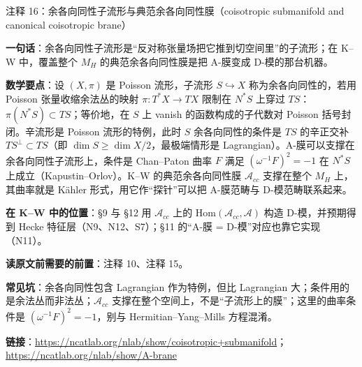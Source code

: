 \begin{kcard}{注释 16：余各向同性子流形与典范余各向同性膜（coisotropic submanifold and canonical coisotropic brane）}

\textbf{一句话}：余各向同性子流形是“反对称张量场把它推到切空间里”的子流形；在 K--W 中，覆盖整个 $M_H$ 的典范余各向同性膜是把 A-膜变成 D-模的那台机器。

\textbf{数学要点}：设 $(X,\pi)$ 是 Poisson 流形，子流形 $S\hookrightarrow X$ 称为余各向同性的，若用 Poisson 张量收缩余法丛的映射 $\pi:T^*X\to TX$ 限制在 $N^*S$ 上穿过 $TS$：$\pi(N^*S)\subset TS$；等价地，在 $S$ 上 vanish 的函数构成的子代数对 Poisson 括号封闭。辛流形是 Poisson 流形的特例，此时 $S$ 余各向同性的条件是 $TS$ 的辛正交补 $TS^{\perp}\subset TS$（即 $\dim S\ge\dim X/2$，最极端情形是 Lagrangian）。A-膜可以支撑在余各向同性子流形上，条件是 Chan--Paton 曲率 $F$ 满足 $(\omega^{-1}F)^2=-1$ 在 $N^*S$ 上成立（Kapustin--Orlov）。K--W 的典范余各向同性膜 $\mathcal{A}_{cc}$ 支撑在整个 $M_H$ 上，其曲率就是 Kähler 形式，用它作“探针”可以把 A-膜范畴与 D-模范畴联系起来。

\textbf{在 K--W 中的位置}：§9 与 §12 用 $\mathcal{A}_{cc}$ 上的 $\mathrm{Hom}(\mathcal{A}_{cc},\mathcal{A})$ 构造 D-模，并预期得到 Hecke 特征层（N9、N12、S7）；§11 的“A-膜 = D-模”对应也靠它实现（N11）。

\textbf{读原文前需要的前置}：注释 10、注释 15。

\textbf{常见坑}：余各向同性包含 Lagrangian 作为特例，但比 Lagrangian 大；条件用的是余法丛而非法丛；$\mathcal{A}_{cc}$ 支撑在整个空间上，不是“子流形上的膜”；这里的曲率条件是 $(\omega^{-1}F)^2=-1$，别与 Hermitian--Yang--Mills 方程混淆。

\noindent\textbf{链接}：\url{https://ncatlab.org/nlab/show/coisotropic+submanifold}；\url{https://ncatlab.org/nlab/show/A-brane}
\end{kcard}

